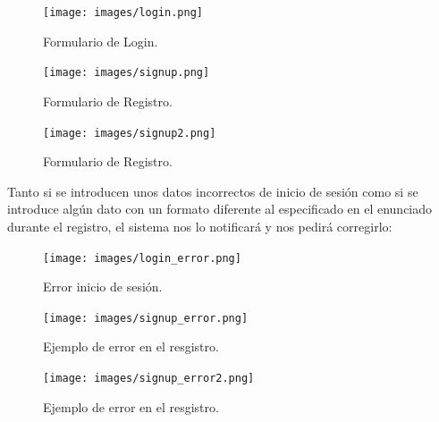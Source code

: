 \documentclass[12pt, twoside]{report}
\begin{document}
\begin{figure}[h]
\begin{center}
\texttt{[image: images/login.png]}
\end{center}
\caption{\label{inicio} Formulario de Login.}
\end{figure}
\clearpage
\begin{figure}[h]
\begin{center}
\texttt{[image: images/signup.png]}
\end{center}
\caption{\label{inicio} Formulario de Registro.}
\end{figure}
\begin{figure}[h]
\begin{center}
\texttt{[image: images/signup2.png]}
\end{center}
\caption{\label{inicio} Formulario de Registro.}
\end{figure}
\clearpage
\noindent Tanto si se introducen unos datos incorrectos de inicio de sesión como si se introduce algún dato con un formato diferente al especificado en el enunciado durante el registro, el sistema nos lo notificará y nos pedirá corregirlo:\\
\begin{figure}[h]
\begin{center}
\texttt{[image: images/login\_error.png]}
\end{center}
\caption{\label{inicio} Error inicio de sesión.}
\end{figure}
\begin{figure}[h]
\begin{center}
\texttt{[image: images/signup\_error.png]}
\end{center}
\caption{\label{inicio} Ejemplo de error en el resgistro.}
\end{figure}
\begin{figure}[h]
\begin{center}
\texttt{[image: images/signup\_error2.png]}
\end{center}
\caption{\label{inicio} Ejemplo de error en el resgistro.}
\end{figure}
\clearpage
\end{document}
